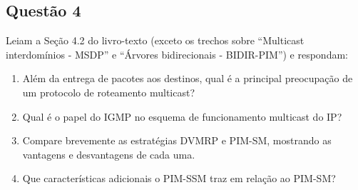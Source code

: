 \subsection{Questão 4}
Leiam a Seção 4.2 do livro-texto (exceto os trechos sobre “Multicast
interdomínios - MSDP” e “Árvores bidirecionais - BIDIR-PIM”) e respondam:

\begin{enumerate}[label=\alph*.]
    \item Além da entrega de pacotes aos destinos, qual é a principal preocupação de um
    protocolo de roteamento multicast?
    \item Qual é o papel do IGMP no esquema de funcionamento multicast do IP?
    \item Compare brevemente as estratégias DVMRP e PIM-SM, mostrando as vantagens e
    desvantagens de cada uma.
    \item Que características adicionais o PIM-SSM traz em relação ao PIM-SM?
\end{enumerate}

